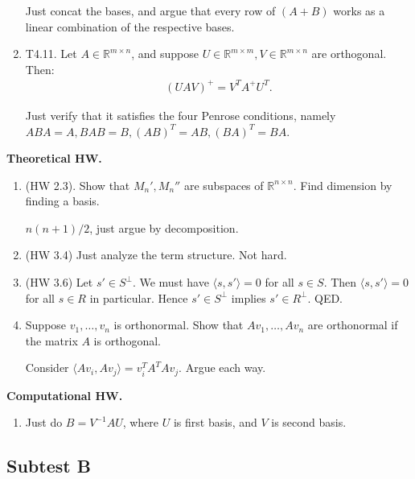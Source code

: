 \documentclass{article}
\newcommand{\RR}{\mathbb{R}}
\newcommand{\la}{\langle}
\newcommand{\ra}{\rangle}
\begin{document}
\begin{enumerate}
      Just concat the bases, and argue that every row of $(A+B)$ works as a linear combination of the respective bases.

    \item T4.11. Let $A \in \RR^{m \times n}$, and suppose $U \in \RR^{m \times m}, V \in \RR^{m \times n}$ are orthogonal.  Then:
      \begin{align*}
        (U A V)^{+} = V^T A^{+} U^T.
      \end{align*}

      Just verify that it satisfies the four Penrose conditions, namely $ABA = A, BAB =  B, (AB)^T = AB, (BA)^T = BA$.

\end{enumerate}

{\bf Theoretical HW.}

\begin{enumerate}
  \item  (HW 2.3). Show that $M_n', M_n''$ are subspaces of $\RR^{n \times n}$.  Find dimension by finding a basis.

    $n(n+1)/2$, just argue by decomposition.

  \item (HW 3.4) Just analyze the term structure.  Not hard.

  \item (HW 3.6) Let $s' \in S^{\perp}$.  We must have $\la s, s' \ra = 0$ for all $s \in S$.  Then $\la s, s' \ra = 0$ for all $s \in R$ in particular.   Hence $s' \in S^{\perp}$ implies $s' \in R^{\perp}$.  QED.

  \item Suppose $v_1, \dots, v_n$ is orthonormal.  Show that $Av_1, \dots, Av_n$ are orthonormal if the matrix $A$ is orthogonal.

    Consider $\la A v_i, A v_j \ra = v_i^T A^T A v_j$.  Argue each way. 

\end{enumerate}

{\bf Computational HW.}

\begin{enumerate}
  \item Just do $B = V^{-1} A U$, where $U$ is first basis, and $V$ is second basis.
\end{enumerate}

\subsection{Subtest B}
\end{document}
